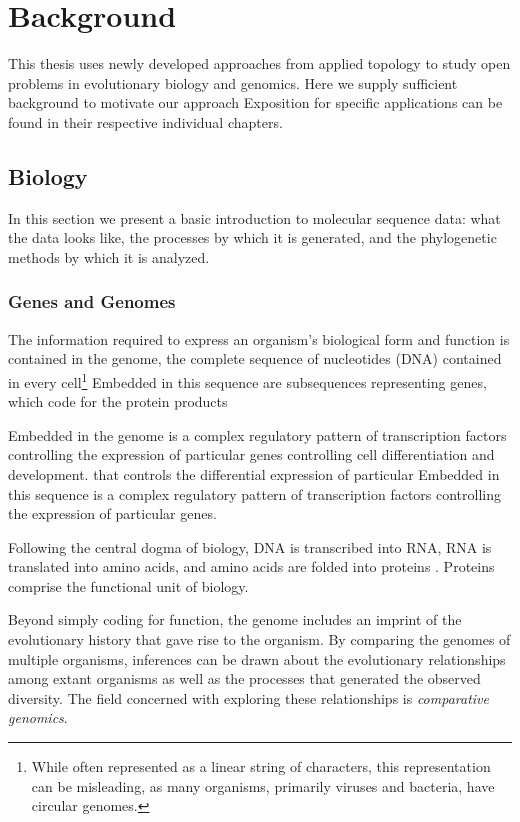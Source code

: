 \chapter{Background}
\label{ch:background}

This thesis uses newly developed approaches from applied topology to study open problems in evolutionary biology and genomics.
Here we supply sufficient background to motivate our approach
Exposition for specific applications can be found in their respective individual chapters.

\section{Biology}

In this section we present a basic introduction to molecular sequence data: what the data looks like, the processes by which it is generated, and the phylogenetic methods by which it is analyzed.

\subsection{Genes and Genomes}

The information required to express an organism's biological form and function is contained in the genome, the complete sequence of nucleotides (DNA) contained in every cell\footnote{While often represented as a linear string of characters, this representation can be misleading, as many organisms, primarily viruses and bacteria, have circular genomes.}
Embedded in this sequence are subsequences representing genes, which code for the protein products


Embedded in the genome is a complex regulatory pattern of transcription factors controlling the expression of particular genes controlling cell differentiation and development.
that controls the differential expression of particular 
Embedded in this sequence is a complex regulatory pattern of transcription factors controlling the expression of particular genes.

Following the central dogma of biology, DNA is transcribed into RNA, RNA is translated into amino acids, and amino acids are folded into proteins \cite{Crick:1970wb}.
Proteins comprise the functional unit of biology.

Beyond simply coding for function, the genome includes an imprint of the evolutionary history that gave rise to the organism.
By comparing the genomes of multiple organisms, inferences can be drawn about the evolutionary relationships among extant organisms as well as the processes that generated the observed diversity.
The field concerned with exploring these relationships is \emph{comparative genomics}.

